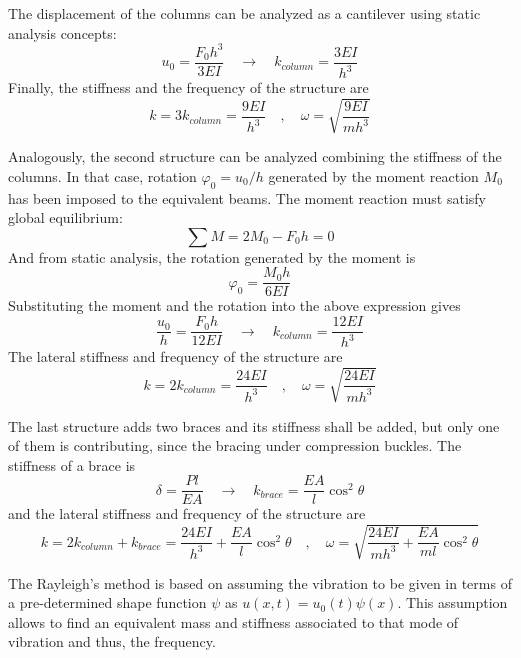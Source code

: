 \documentclass{problems}
\begin{document}
\begin{center}
\end{center}

The displacement of the columns can be analyzed as a cantilever using static analysis concepts:
$$
u_0 = \frac{F_0h^3}{3EI} \quad \rightarrow \quad k_{column} = \frac{3EI}{h^3}
$$
Finally, the stiffness and the frequency of the structure are
$$
k = 3k_{column} = \frac{9EI}{h^3} \quad , \quad \omega = \sqrt{\frac{9EI}{mh^3}}
$$

\begin{center}
\end{center}

Analogously, the second structure can be analyzed combining the stiffness of the columns. In that case, rotation $\varphi_0 = u_0/h$ generated by the moment reaction $M_0$ has been imposed to the equivalent beams. The moment reaction must satisfy global equilibrium:
$$
\sum M = 2M_0 -F_0h = 0
$$
And from static analysis, the rotation generated by the moment is
$$
\varphi_0 = \frac{M_0h}{6EI}
$$
Substituting the moment and the rotation into the above expression gives
$$
\frac{u_0}{h} = \frac{F_0h}{12EI} \quad \rightarrow \quad k_{column} = \frac{12EI}{h^3}
$$
The lateral stiffness and frequency of the structure are
$$
k = 2k_{column} = \frac{24EI}{h^3} \quad , \quad \omega = \sqrt{\frac{24EI}{mh^3}}
$$

\begin{center}
\end{center}

The last structure adds two braces and its stiffness shall be added, but only one of them is contributing, since the bracing under compression buckles. The stiffness of a brace is
$$
\delta = \frac{Pl}{EA} \quad \rightarrow \quad k_{brace} = \frac{EA}{l}\cos^2\theta
$$
and the lateral stiffness and frequency of the structure are
$$
k = 2k_{column} + k_{brace} = \frac{24EI}{h^3}+\frac{EA}{l}\cos^2\theta \quad , \quad 
\omega = \sqrt{\frac{24EI}{mh^3}+\frac{EA}{ml}\cos^2\theta}
$$



The Rayleigh's method is based on assuming the vibration to be given in terms of a pre-determined shape function $\psi$ as $u(x,t) = u_0(t)\psi(x)$. This assumption allows to find an equivalent mass and stiffness associated to that mode of vibration and thus, the frequency.
\end{document}
